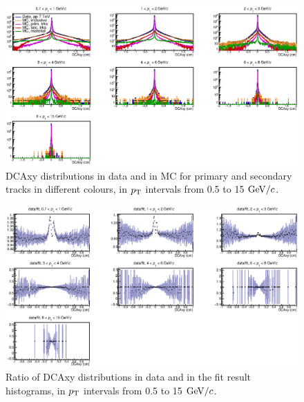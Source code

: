 \begin{figure}[!htb]
\begin{center}
\includegraphics[width=.99\textwidth]{FigCap4/FitComponents.eps}
\caption{DCAxy distributions in data and in MC for primary and secondary tracks in different colours, in $p_{\rm T}$ intervals from 0.5 to 15 $\mathrm{GeV}/c$.}
\label{fig:DCAxyDataMCVsPt}
\end{center}
\end{figure}

\begin{figure}[!htb]
\begin{center}
\includegraphics[width=.99\textwidth]{FigCap4/DataOverFit.eps}
\caption{Ratio of DCAxy distributions in data and in the fit result histograms, in $p_{\rm T}$ intervals from 0.5 to 15 $\mathrm{GeV}/c$.}
\label{fig:DCAxyRatioDataFitVsPt}
\end{center}
\end{figure}

